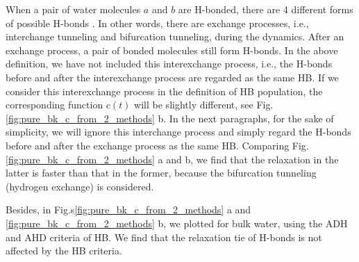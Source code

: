 When a pair of water molecules $a$ and $b$ are H-bonded, 
there are 4 different forms of possible H-bonds . 
In other words, there are exchange processes, i.e., interchange tunneling and bifurcation tunneling, during the dynamics.
After an exchange process, a pair of bonded molecules still form H-bonds.
In the above definition, we have not included this interexchange process, i.e., the H-bonds before and after the interexchange process are regarded as the same HB.
If we consider this interexchange process in the definition of HB population, the corresponding function $c(t)$ will be slightly different, 
see Fig.\thinspace\ref{fig:pure_bk_c_from_2_methods} b.   
In the next paragraphs, for the sake of simplicity, 
we will ignore this interchange process and simply regard the H-bonds before and after the exchange process as the same HB.
Comparing Fig.\thinspace\ref{fig:pure_bk_c_from_2_methods} a and b,  
we find that the relaxation in the latter is faster than that in the former,
because the bifurcation tunneling (hydrogen exchange) is considered.

Besides, in Fig.s\thinspace\ref{fig:pure_bk_c_from_2_methods} a and \ref{fig:pure_bk_c_from_2_methods} b, 
we plotted \CHB for bulk water, using the ADH and AHD criteria of HB. We find that the relaxation tie of H-bonds is not affected by the HB criteria. 
%

